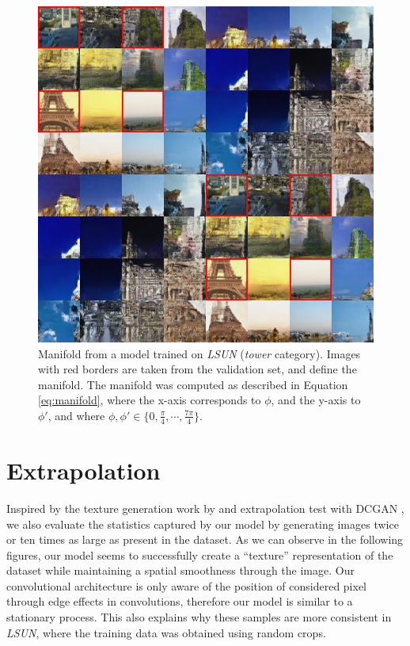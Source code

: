 \documentclass{article}
\begin{document}
\begin{figure}[H]
\vspace{30pt}
    \centering \includegraphics[width=1.\textwidth]{tower_manifold_highlight.jpg}
    \caption{Manifold from a model trained on \emph{LSUN} (\emph{tower} category). Images with red borders are taken from the validation set, and define the manifold. The manifold was computed as described in Equation \ref{eq:manifold}, where the x-axis corresponds to $\phi$, and the y-axis to $\phi'$, and where $\phi, \phi' \in \{0, \frac{\pi}{4}, \cdots, \frac{7\pi}{4}\}$. }
\end{figure}

\section{Extrapolation}
Inspired by the texture generation work by \citep{DBLP:conf/nips/GatysEB15,theis2015generative} and extrapolation test with DCGAN \citep{DBLP:journals/corr/RadfordMC15}, we also evaluate the statistics captured by our model by generating images twice or ten times as large as present in the dataset.
As we can observe in the following figures, our model seems to successfully create a “texture” representation of the dataset while maintaining a spatial smoothness through the image. Our convolutional architecture is only aware of the position of considered pixel through edge effects in convolutions, therefore our model is similar to a stationary process. This also explains why these samples are more consistent in \emph{LSUN}, where the training data was obtained using random crops.
\newpage
\end{document}
